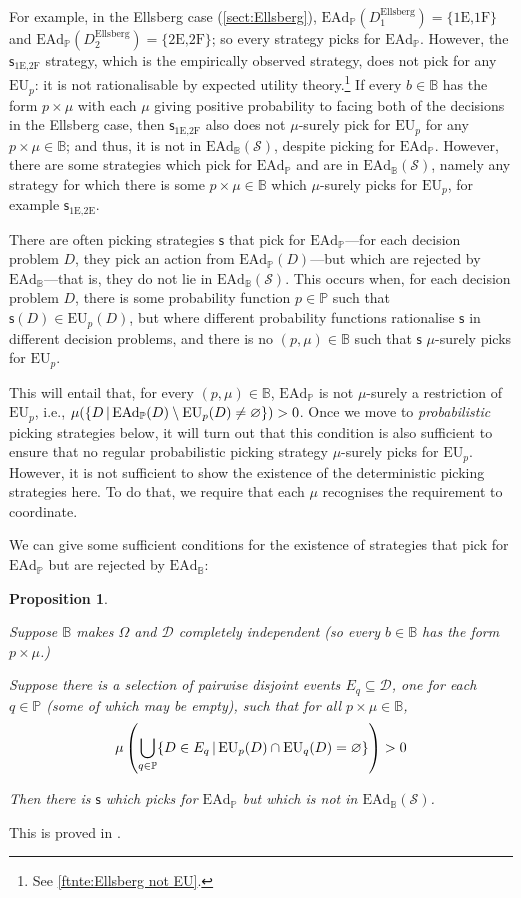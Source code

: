 \documentclass[a4paper]{article}
\newtheorem{proposition}[theorem]{Proposition}
\renewcommand\P{\mathbb{P}} %
\newcommand\EU{\mathrm{EU}}
\newcommand\EAd{\mathrm{EAd}}
\newcommand{\Decs}{\mathcal{D}}
\renewcommand\S{\mathcal{S}}
\newcommand\s{\mathsf{s}}
\newcommand{\IB}{\mathbb{B}}
\newcommand{\IP}{\P}
\renewcommand{\color}[1]{}
\newenvironment{colored}[1]{\leavevmode\color{#1}}{}
\newcommand{\Strategies}{\S}
\newcommand\SetDelimiter[1][]{
	\nonscript\,#1\vert \allowbreak \nonscript\,\mathopen{}}
\providecommand\given{\SetDelimiter}
\renewcommand{\emptyset}{\varnothing}
\newenvironment{CCM rewritten}
{\begingroup\color{blue}} %
{\endgroup}              %
\begin{document}
For example, in the Ellsberg case (\cref{sect:Ellsberg}), $\EAd_\IP(D^{\mathrm{Ellsberg}}_1)=\{\text{1E,1F}\}$ and $\EAd_\IP(D^{\mathrm{Ellsberg}}_2)=\{\text{2E,2F}\}$; so every strategy picks for $\EAd_\IP$. 
However, the $\s_{\text{1E,2F}}$ strategy, which is the empirically observed strategy, does not pick for any $\EU_p$: it is not rationalisable by expected utility theory.\footnote{See \cref{ftnte:Ellsberg not EU}.} 
If every $b\in\IB$ has the form $p\times\mu$ with each $\mu$ giving positive probability to facing both of the decisions in the Ellsberg case, then $\s_{\text{1E,2F}}$ also does not $\mu$-surely pick for $\EU_p$ for any $p\times\mu\in\IB$; and thus, it is not in $\EAd_\IB(\S)$, despite picking for $\EAd_\IP$. 
However, there are some strategies which pick for $\EAd_\IP$ and are in $\EAd_\IB(\S)$, namely any strategy for which there is some $p\times\mu\in\IB$ which $\mu$-surely picks for $\EU_p$, for example $\s_{\text{1E,2E}}$. 


	
There are often picking strategies $\s$ that pick for $\EAd_\IP$---for each decision problem $D$, they pick an action from $\EAd_\IP(D)$---but which are rejected by $\EAd_\IB$---that is, they do not lie in $\EAd_\IB(\Strategies)$. 
This occurs when, for each decision problem $D$, there is some probability function $p\in\IP$ such that $\s(D)\in\EU_p(D)$, but where different probability functions rationalise $\s$ in different decision problems, and there is no $(p,\mu)\in\IB$ such that $\s$ $\mu$-surely picks for $\EU_p$. 

This will entail that, for every $(p,\mu)\in\IB$, $\EAd_\IP$ is not $\mu$-surely a restriction of $\EU_p$, i.e., $\mu(\{D\given \EAd_\IP(D)\setminus\EU_p(D)\neq\emptyset\})>0$. Once we move to \emph{probabilistic} picking strategies below, it will turn out that this condition is also sufficient to ensure that no regular probabilistic picking strategy $\mu$-surely picks for $\EU_p$. However, it is not sufficient to show the existence of the deterministic picking strategies here. To do that, we require that each $\mu$ recognises the requirement to coordinate. 

We can give some sufficient conditions for the existence of strategies that pick for $\EAd_\IP$ but are rejected by $\EAd_\IB$: 
\begin{proposition}\label{thm:ead-existsimpermissible[indep]}

Suppose $\IB$ makes $\Omega$ and $\Decs$ completely independent (so every $b\in\IB$ has the form $p\times\mu$.)

Suppose there is a selection of pairwise disjoint events $E_q\subseteq\Decs$, one for each $q\in\IP$ (some of which may be empty), such that for all $p\times\mu\in\IB$, 
\[
\mu\left(\bigcup_{q\in\IP}\{D\in E_q\given \EU_p(D)\cap\EU_q(D)=\emptyset\}\right)>0
\]

Then there is $\s$ which picks for $\EAd_\IP$ but which is not in $\EAd_\IB(\S)$. 
\end{proposition}
This is proved in .
\end{document}
